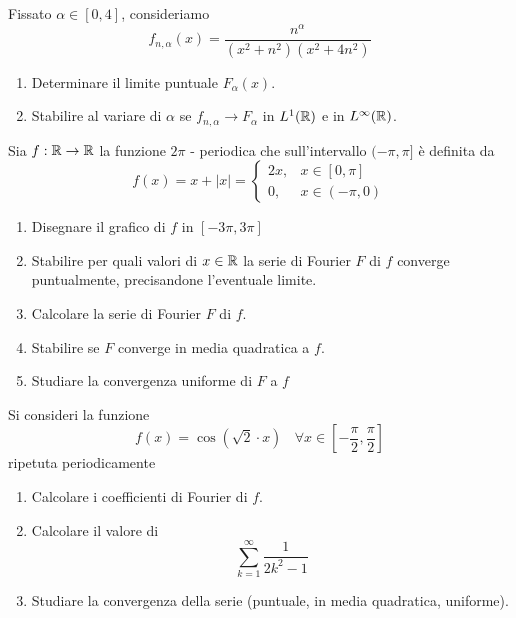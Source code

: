 Fissato $\alpha \in [ 0,4]$, consideriamo
\begin{equation*}
f_{n,\alpha }(x) = \frac{n^{\alpha }}{\left(x^{2} + n^{2}\right)\left(x^{2} + 4n^{2}\right)}
\end{equation*}
\begin{enumerate}
\item Determinare il limite puntuale $F_{\alpha }(x)$.
\item Stabilire al variare di $\alpha $ se $f_{n,\alpha }\rightarrow F_{\alpha }$ in $L^{1}(\mathbb{R})$ e in $L^{\infty }(\mathbb{R})$.
\end{enumerate}
\Esercizio{}

Sia $f:\mathbb{R} \rightarrow \mathbb{R} $ la funzione $2\pi $ - periodica che sull'intervallo $(- \pi ,\pi ]$ è definita da
\begin{equation*}
f(x) = x + | x| = 
\begin{cases}
2x, & x\in [ 0,\pi ]\\
0, & x\in (- \pi ,0)
\end{cases}
\end{equation*}
\begin{enumerate}
\item Disegnare il grafico di $f$ in $[ - 3\pi ,3\pi ]$
\item Stabilire per quali valori di $x\in \mathbb{R} $ la serie di Fourier $F$ di $f$ converge puntualmente, precisandone l'eventuale limite.
\item Calcolare la serie di Fourier $F$ di $f$.
\item Stabilire se $F$ converge in media quadratica a $f$.
\item Studiare la convergenza uniforme di $F$ a $f$
\end{enumerate}
\Esercizio{}

Si consideri la funzione
\begin{equation*}
f(x) = \cos\left(\sqrt{2} \cdot x\right) \ \ \ \ \forall x\in \left[ - \frac{\pi }{2} ,\frac{\pi }{2}\right]
\end{equation*}
ripetuta periodicamente
\begin{enumerate}
\item Calcolare i coefficienti di Fourier di $f$.
\item Calcolare il valore di
\begin{equation*}
\sum\limits ^{\infty }_{k = 1}\frac{1}{2k^{2} - 1}
\end{equation*}
\item Studiare la convergenza della serie (puntuale, in media quadratica, uniforme).
\end{enumerate}
\ParteSoluzioni
\Soluzione

